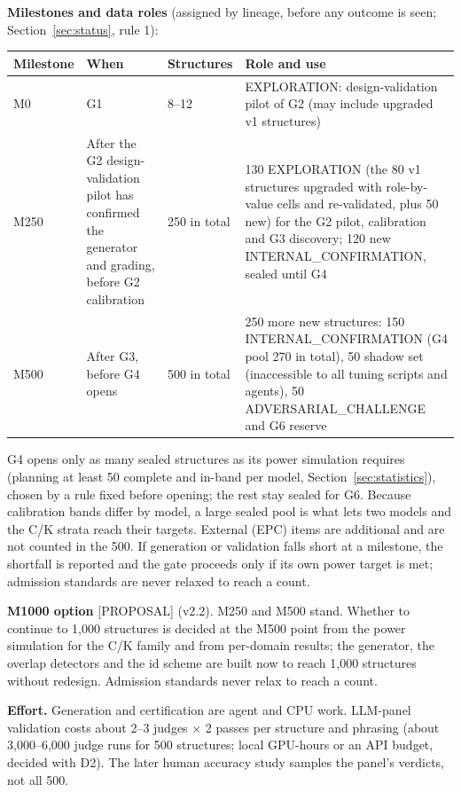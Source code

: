 \documentclass[10pt,a4paper]{article}
\newcommand{\tg}[1]{\textsc{[#1]}}
\begin{document}
\textbf{Milestones and data roles} (assigned by lineage, before any outcome is seen; Section~\ref{sec:status},
rule 1):
\begin{center}\small
\begin{tabularx}{\linewidth}{@{}P{2.3cm}P{3.0cm}P{2.6cm}L@{}}
\toprule
Milestone & When & Structures & Role and use \\
\midrule
M0 & G1 & 8--12 & EXPLORATION: design-validation pilot of G2 (may include upgraded v1 structures) \\
M250 & After the G2 design-validation pilot has confirmed the generator and grading, before G2 calibration & 250 in total & 130 EXPLORATION (the 80 v1 structures upgraded with role-by-value cells and re-validated, plus 50 new) for the G2 pilot, calibration and G3 discovery; 120 new INTERNAL\_CONFIRMATION, sealed until G4 \\
M500 & After G3, before G4 opens & 500 in total & 250 more new structures: 150 INTERNAL\_CONFIRMATION (G4 pool 270 in total), 50 shadow set (inaccessible to all tuning scripts and agents), 50 ADVERSARIAL\_CHALLENGE and G6 reserve \\
\bottomrule
\end{tabularx}
\end{center}
G4 opens only as many sealed structures as its power simulation requires (planning at least 50 complete and
in-band per model, Section~\ref{sec:statistics}), chosen by a rule fixed before opening; the rest stay sealed for
G6. Because calibration bands differ by model, a large sealed pool is what lets two models and the C/K strata reach
their targets. External (EPC) items are additional and are not counted in the 500. If generation or validation
falls short at a milestone, the shortfall is reported and the gate proceeds only if its own power target is met;
admission standards are never relaxed to reach a count.

\textbf{M1000 option} \tg{PROPOSAL} (v2.2). M250 and M500 stand. Whether to continue to 1{,}000 structures is decided at the M500
point from the power simulation for the C/K family and from per-domain results; the generator, the overlap detectors and the
id scheme are built now to reach 1{,}000 structures without redesign. Admission standards never relax to reach a count.

\textbf{Effort.} Generation and certification are agent and CPU work. LLM-panel validation costs about 2--3 judges
$\times$ 2 passes per structure and phrasing (about 3,000--6,000 judge runs for 500 structures; local GPU-hours or
an API budget, decided with D2). The later human accuracy study samples the panel's verdicts, not all 500.
\end{document}
